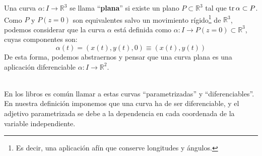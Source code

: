 \begin{definicion}
    Una curva $\alpha:I\to \mathbb{R}^3$ se llama ``\textbf{plana}'' si existe un plano $P\subset \mathbb{R}^3$ tal que $\operatorname{tr} \alpha \subset P$.\\

    \noindent
    Como $P$ y $P(z=0)$ son equivalentes salvo un movimiento rígido\footnote{Es decir, una aplicación afín que conserve longitudes y ángulos.} de $\mathbb{R}^3$, podemos considerar que la curva $\alpha$ está definida como $\alpha:I\to P(z=0)\subset \mathbb{R}^3$, cuyas componentes son:
    \begin{equation*}
        \alpha(t) = (x(t), y(t), 0) \equiv (x(t), y(t))
    \end{equation*}
    De esta forma, podemos abstraernos y pensar que una curva plana es una aplicación diferenciable $\alpha:I\to \mathbb{R}^2$.
\end{definicion}~\\

\noindent
En los libros es común llamar a estas curvas ``parametrizadas'' y ``diferenciables''. En nuestra definición imponemos que una curva ha de ser diferenciable, y el adjetivo parametrizada se debe a la dependencia en cada coordenada de la variable independiente.

